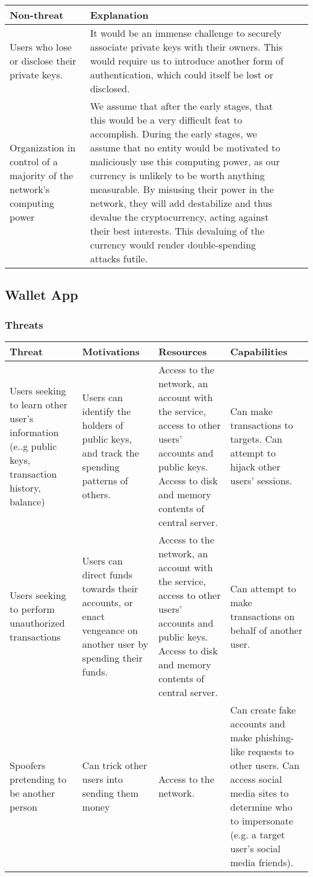 \documentclass[12pt]{article}
\begin{document}
\begin{tabulary}{\linewidth}{|L|L|L|L|}
\hline
\textbf{Non-threat} & \textbf{Explanation}\\
\hline
Users who lose or disclose their private keys. & It would be an immense challenge to securely associate private keys with their owners. This would require us to introduce another form of authentication, which could itself be lost or disclosed. \\
\hline
Organization in control of a majority of the network's computing power & We assume that after the early stages, that this would be a very difficult feat to accomplish. During the early stages, we assume that no entity would be motivated to maliciously use this computing power, as our currency is unlikely to be worth anything measurable. By misusing their power in the network, they will add destabilize and thus devalue the cryptocurrency, acting against their best interests. This devaluing of the currency would render double-spending attacks futile. \\
\hline
\end{tabulary}

\subsection{Wallet App}

\subsubsection*{Threats}

\begin{tabulary}{\linewidth}{|L|L|L|L|}
\hline
\textbf{Threat} & \textbf{Motivations} & \textbf{Resources} & \textbf{Capabilities} \\
\hline
Users seeking to learn other user's information (e..g public keys, transaction history, balance) & Users can identify the holders of public keys, and track the spending patterns of others. & Access to the network, an account with the service, access to other users' accounts and public keys. Access to disk and memory contents of central server. & Can make transactions to targets. Can attempt to hijack other users' sessions. \\
\hline
Users seeking to perform unauthorized transactions & Users can direct funds towards their accounts, or enact vengeance on another user by spending their funds. & Access to the network, an account with the service, access to other users' accounts and public keys. Access to disk and memory contents of central server. & Can attempt to make transactions on behalf of another user. \\
\hline
Spoofers pretending to be another person & Can trick other users into sending them money & Access to the network. & Can create fake accounts and make phishing-like requests to other users. Can access social media sites to determine who to impersonate (e.g. a target user's social media friends). \\
\hline
\end{tabulary}
\end{document}
